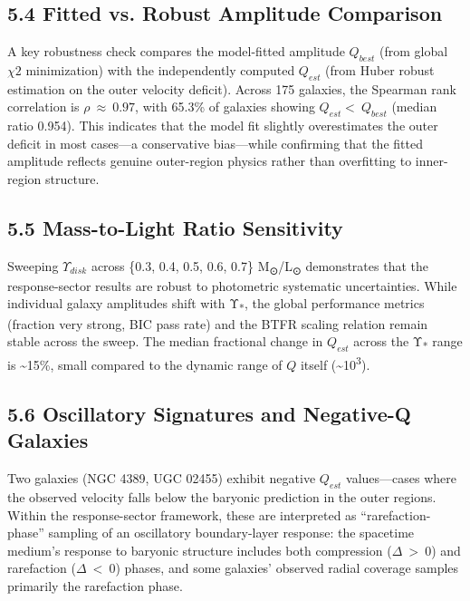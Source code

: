 \subsection{5.4 Fitted vs. Robust Amplitude Comparison}\label{fitted-vs.-robust-amplitude-comparison}

A key robustness check compares the model-fitted amplitude \(Q_{best}\) (from global \(\chi 2\) minimization) with the independently computed \(Q_{est}\) (from Huber robust estimation on the outer velocity deficit). Across 175 galaxies, the Spearman rank correlation is \(\rho\  \approx \ 0.97\), with 65.3\% of galaxies showing \(Q_{est} < \ Q_{best}\) (median ratio 0.954). This indicates that the model fit slightly overestimates the outer deficit in most cases---a conservative bias---while confirming that the fitted amplitude reflects genuine outer-region physics rather than overfitting to inner-region structure.

\subsection{5.5 Mass-to-Light Ratio Sensitivity}\label{mass-to-light-ratio-sensitivity}

Sweeping \(\Upsilon_{disk}\) across \{0.3, 0.4, 0.5, 0.6, 0.7\} M\textsubscript{⊙}/L\textsubscript{⊙} demonstrates that the response-sector results are robust to photometric systematic uncertainties. While individual galaxy amplitudes shift with Υ\textsubscript{*}, the global performance metrics (fraction very strong, BIC pass rate) and the BTFR scaling relation remain stable across the sweep. The median fractional change in \(Q_{est}\) across the Υ\textsubscript{*} range is \textasciitilde15\%, small compared to the dynamic range of \(Q\) itself (\textasciitilde10\textsuperscript{3}).

\subsection{5.6 Oscillatory Signatures and Negative-Q Galaxies}\label{oscillatory-signatures-and-negative-q-galaxies}

Two galaxies (NGC 4389, UGC 02455) exhibit negative \(Q_{est}\) values---cases where the observed velocity falls below the baryonic prediction in the outer regions. Within the response-sector framework, these are interpreted as ``rarefaction-phase'' sampling of an oscillatory boundary-layer response: the spacetime medium's response to baryonic structure includes both compression (\(\Delta\  > \ 0\)) and rarefaction (\(\Delta\  < \ 0\)) phases, and some galaxies' observed radial coverage samples primarily the rarefaction phase.

